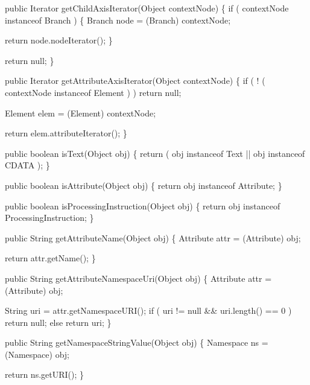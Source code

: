 \documentclass[20pt,landscape,headrule,footrule]{foils}
\begin{document}
\begin{codelisting}    
public Iterator getChildAxisIterator(Object contextNode)
\{
    if ( contextNode instanceof Branch )
    \{
        Branch node = (Branch) contextNode;
        
        return node.nodeIterator();
    \}

    return null;
\}

public Iterator getAttributeAxisIterator(Object contextNode)
\{
    if ( ! ( contextNode instanceof Element ) )
    {
        return null;
    }

    Element elem = (Element) contextNode;

    return elem.attributeIterator();
\}
\end{codelisting}


\begin{codelisting}
public boolean isText(Object obj)
\{
    return ( obj instanceof Text 
             ||
             obj instanceof CDATA );
\}

public boolean isAttribute(Object obj)
\{
    return obj instanceof Attribute;
\}    

public boolean isProcessingInstruction(Object obj)
\{
    return obj instanceof ProcessingInstruction;
\}
\end{codelisting}


\begin{codelisting}    
public String getAttributeName(Object obj)
\{
    Attribute attr = (Attribute) obj;

    return attr.getName();
\}

public String getAttributeNamespaceUri(Object obj)
\{
    Attribute attr = (Attribute) obj;

    String uri = attr.getNamespaceURI();
    if ( uri != null && uri.length() == 0 ) 
        return null;
    else
        return uri;
\}

public String getNamespaceStringValue(Object obj)
\{
    Namespace ns = (Namespace) obj;

    return ns.getURI();
\}
\end{codelisting}

\end{document}

